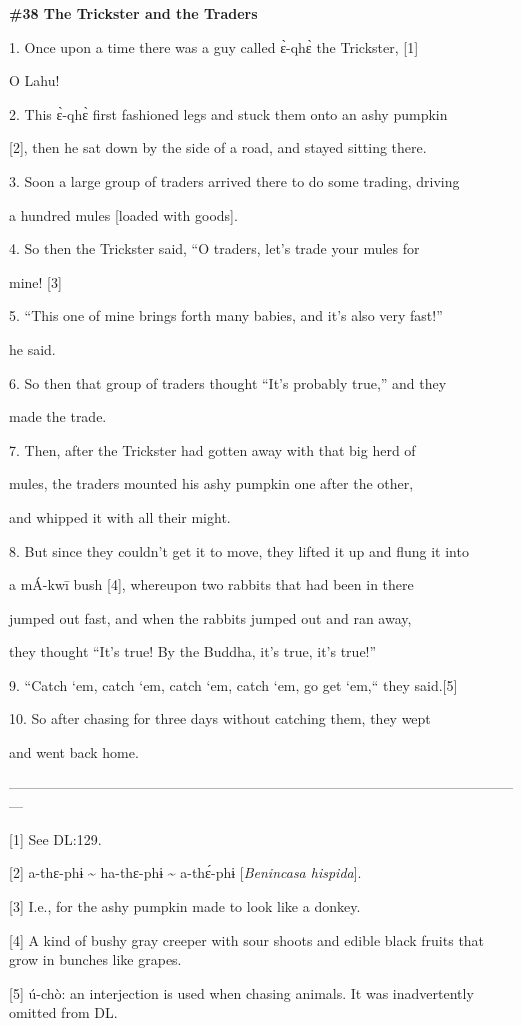 
{\textbf{\#38 The Trickster and the Traders}}

{1. Once upon a time there was a guy called ɛ̀-qhɛ̀ the Trickster, [1]
}

{O Lahu!}

{2. This ɛ̀-qhɛ̀ first fashioned legs and stuck them onto an ashy pumpkin
}

{[2], then he sat down by the side of a road, and stayed sitting there.}

{3. Soon a large group of traders arrived there to do some trading, driving
}

{a hundred mules [loaded with goods].}

{4. So then the Trickster said, ``O traders, let's trade your mules for
}

{mine! [3]}

{5. ``This one of mine brings forth many babies, and it's also very fast!''
}

{he said.}

{6. So then that group of traders thought ``It's probably true,'' and they
}

{made the trade.}

{7. Then, after the Trickster had gotten away with that big herd of
}

{mules, the traders mounted his ashy pumpkin one after the other,     }

{and whipped it with all their might.}

{8. But since they couldn't get it to move, they lifted it up and flung
it into    }

{a mÁ-kwī bush [4], whereupon two rabbits that had been in there    }

{jumped out fast, and when the rabbits jumped out and ran away,    }

{they thought ``It's true! By the Buddha, it's true, it's true!''}

{9. ``Catch `em, catch `em, catch `em, catch `em, go get `em,``
they said.[5]}

{10. So after chasing for three days without catching them, they wept
}

{and went back home.}

{---------------------------------------------------------------------------------------------------------------}

{[1] See DL:129.}

{[2] a-thɛ-phɨ \textasciitilde{} ha-thɛ-phɨ \textasciitilde{} a-thɛ́-phɨ
[}{\textit{Benincasa hispida}}{].}

{[3] I.e., for the ashy pumpkin made to look like a donkey.}

{[4] A kind of bushy gray creeper with sour shoots and edible black fruits
that grow in bunches like grapes.}

{[5] ú-chò: an interjection is used when chasing animals. It was inadvertently
omitted from DL.}


